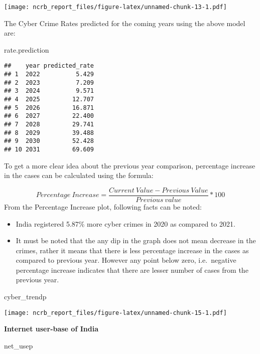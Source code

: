\documentclass[
  12,
  a4paper,
]{report}
\newenvironment{Shaded}{\begin{snugshade}}{\end{snugshade}}
\newcommand{\NormalTok}[1]{#1}
\providecommand{\tightlist}{%
  \setlength{\itemsep}{0pt}\setlength{\parskip}{0pt}}
\begin{document}
\texttt{[image: ncrb\_report\_files/figure-latex/unnamed-chunk-13-1.pdf]}

The Cyber Crime Rates predicted for the coming years using the above
model are:

\begin{Shaded}
\begin{Highlighting}[]
\NormalTok{rate.prediction}
\end{Highlighting}
\end{Shaded}

\begin{verbatim}
##    year predicted_rate
## 1  2022          5.429
## 2  2023          7.209
## 3  2024          9.571
## 4  2025         12.707
## 5  2026         16.871
## 6  2027         22.400
## 7  2028         29.741
## 8  2029         39.488
## 9  2030         52.428
## 10 2031         69.609
\end{verbatim}

To get a more clear idea about the previous year comparison, percentage
increase in the cases can be calculated using the formula:

\[ Percentage \ Increase =  \frac{Current \ Value - Previous \ Value}{Previous \ value} *100\]
From the Percentage Increase plot, following facts can be noted:

\begin{itemize}
\tightlist
\item
  India registered 5.87\% more cyber crimes in 2020 as compared to
  2021.\\
\item
  It must be noted that the any dip in the graph does not mean decrease
  in the crimes, rather it means that there is less percentage increase
  in the cases as compared to previous year. However any point below
  zero, i.e.~negative percentage increase indicates that there are
  lesser number of cases from the previous year.
\end{itemize}

\begin{Shaded}
\begin{Highlighting}[]
\NormalTok{cyber\_trendp}
\end{Highlighting}
\end{Shaded}

\texttt{[image: ncrb\_report\_files/figure-latex/unnamed-chunk-15-1.pdf]}

\textbf{Internet user-base of India}

\begin{Shaded}
\begin{Highlighting}[]
\NormalTok{net\_usep}
\end{Highlighting}
\end{Shaded}
\end{document}
